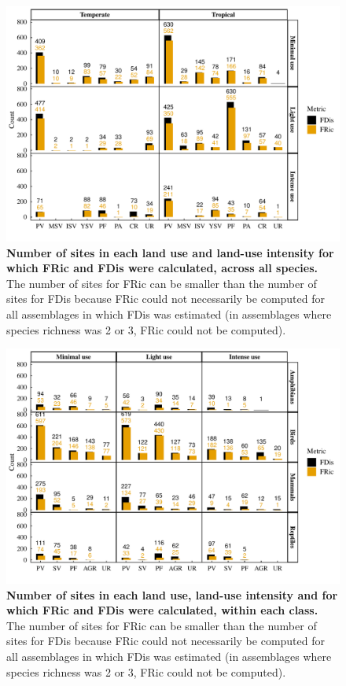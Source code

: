\begin{figure}[h!]
\centering
\includegraphics[scale=0.8]{Supporting/Chapter3/Figures/SI_samplesizes}
\caption[Number of sites in each land use and land-use intensity for which FRic and FDis were calculated, across all species]{\textbf{Number of sites in each land use and land-use intensity for which FRic and FDis were calculated, across all species.} The number of sites for FRic can be smaller than the number of sites for FDis because FRic could not necessarily be computed for all assemblages in which FDis was estimated (in assemblages where species richness was 2 or 3, FRic could not be computed).}
\label{SI3_F1}
\end{figure}

\pagebreak

\begin{figure}[h!]
\centering
\includegraphics[scale=0.8]{Supporting/Chapter3/Figures/SI_samplesizes_fig3}
\caption[Number of sites in each land use, land-use intensity and for which FRic and FDis were calculated, within each class]{\textbf{Number of sites in each land use, land-use intensity and for which FRic and FDis were calculated, within each class.} The number of sites for FRic can be smaller than the number of sites for FDis because FRic could not necessarily be computed for all assemblages in which FDis was estimated (in assemblages where species richness was 2 or 3, FRic could not be computed).}
\label{SI3_F2}
\end{figure}

